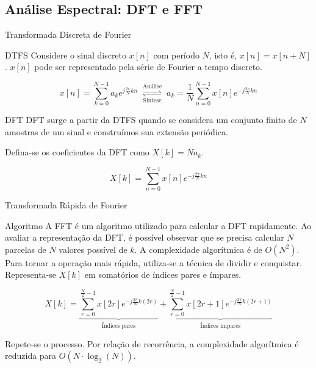 \documentclass{beamer}
\begin{document}
\subsection{Análise Espectral: DFT e FFT}

\begin{frame}{Transformada Discreta de Fourier}

    \begin{block}{DTFS}
        Considere o sinal discreto $x[n]$ com período $N$, isto é, $x[n] = x[n + N]$. $x[n]$ pode ser representado pela série de Fourier a tempo discreto.

        \begin{equation}
            x[n] = \sum_{k=0}^{N-1} a_k e^{j\frac{2\pi}{N}kn} \;\underset{\text{Síntese}}{\overset{\text{Análise}}{\rightleftharpoons}}\; a_k = \frac{1}{N}\sum_{n=0}^{N-1}x[n]e^{-j\frac{2\pi}{N}kn}
        \end{equation}
    \end{block}

    \begin{block}{DFT}
        DFT surge a partir da DTFS quando se considera um conjunto finito de $N$ amostras de um sinal e construímos sua extensão periódica.

        Defina-se os coeficientes da DFT como $X[k]=Na_k$.
        
        \begin{equation}
            X[k]=\sum_{n=0}^{N-1}x[n]e^{-j\frac{2\pi}{N}kn}
        \end{equation}
        
    \end{block}
    
\end{frame}

\begin{frame}{Transformada Rápida de Fourier}

    \begin{block}{Algoritmo}
        A FFT é um algoritmo utilizado para calcular a DFT rapidamente. Ao avaliar a representação da DFT, é possível observar que se precisa calcular $N$ parcelas de $N$ valores possível de $k$. A complexidade algorítmica é de $O(N^2)$. Para tornar a operação mais rápida, utiliza-se a técnica de dividir e conquistar. Representa-se $X[k]$ em somatórios de índices pares e ímpares.

        \begin{equation}
            X[k] = \underbrace{\sum_{r=0}^{\frac{N}{2}-1}x[2r]e^{-j\frac{2\pi}{N}k(2r)}}_{\text{Índices pares}} + \underbrace{\sum_{r=0}^{\frac{N}{2}-1}x[2r+1]e^{-j\frac{2\pi}{N}k(2r+1)}}_{\text{Índices ímpares}}
        \end{equation}

        Repete-se o processo. Por relação de recorrência, a complexidade algorítmica é reduzida para $O(N \cdot \log_2(N))$.
    \end{block}
    
\end{frame}
\end{document}
